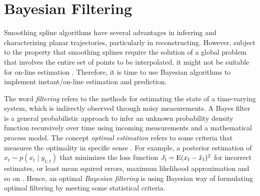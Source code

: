 



%



\section{Bayesian Filtering}

Smoothing spline algorithms have several advantages in inferring and characterizing planar trajectories, particularly in reconstructing. However, subject to the property that smoothing splines require the solution of a global problem that involves the entire set of points to be interpolated, it might not be suitable for on-line estimation \cite{biagiotti2013online}. Therefore, it is time to use Bayesian algorithms to implement instant/on-line estimation and prediction. 


The word \textit{filtering} refers to the methods for estimating the state of a time-varying system, which is indirectly observed through noisy measurements. A Bayes filter is a general probabilistic approach to infer an unknown probability density function recursively over time using incoming measurements and a mathematical process model. The concept \textit{optimal estimation} refers to some criteria that measures the optimality in specific sense \cite{anderson1979optimal}. For example, a posterior estimation of $\hat{x}_t\sim p(x_t\mid y_{1:t})$ that minimizes the loss function $J_t=\mathrm{E} (x_t-\hat{x}_t)^2$ for incorrect estimates, or least mean squired errors, maximum likelihood approximation and so on \cite{chen2003bayesian} \cite{sarkka2013bayesian}. Hence, an optimal \textit{Bayesian filtering} is using Bayesian way of formulating optimal filtering by meeting some statistical criteria. 



